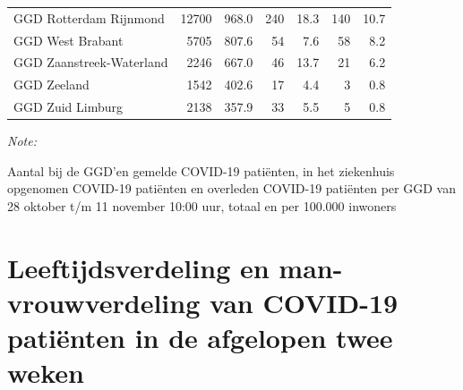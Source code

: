 \documentclass[
  english,
  man,floatsintext]{apa6}
\begin{document}
\begin{table}[H]
\begin{threeparttable}
\begin{tabular}{lrrrrrr}
GGD Rotterdam Rijnmond & 12700 & 968.0 & 240 & 18.3 & 140 & 10.7\\
GGD West Brabant & 5705 & 807.6 & 54 & 7.6 & 58 & 8.2\\
GGD Zaanstreek-Waterland & 2246 & 667.0 & 46 & 13.7 & 21 & 6.2\\
GGD Zeeland & 1542 & 402.6 & 17 & 4.4 & 3 & 0.8\\
GGD Zuid Limburg & 2138 & 357.9 & 33 & 5.5 & 5 & 0.8\\
\bottomrule
\end{tabular}
\begin{tablenotes}
\item \textit{Note: } 
\item Aantal bij de GGD’en gemelde COVID-19 patiënten, in het ziekenhuis opgenomen COVID-19 patiënten en overleden COVID-19 patiënten per GGD van 28 oktober t/m 11 november 10:00 uur, totaal en per 100.000 inwoners
\end{tablenotes}
\end{threeparttable}
\endgroup{}
\end{table}

\newpage

\hypertarget{leeftijdsverdeling-en-man-vrouwverdeling-van-covid-19-patiuxebnten-in-de-afgelopen-twee-weken}{%
\section{Leeftijdsverdeling en man-vrouwverdeling van COVID-19 patiënten in de afgelopen twee weken}\label{leeftijdsverdeling-en-man-vrouwverdeling-van-covid-19-patiuxebnten-in-de-afgelopen-twee-weken}}
\end{document}

